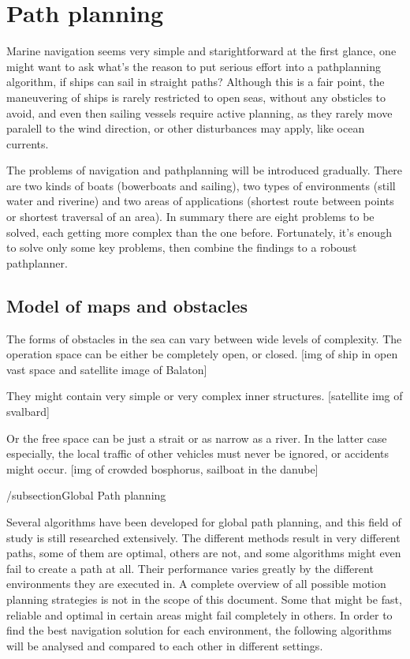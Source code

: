 \section{Path planning} 

Marine navigation seems very simple and starightforward at the first glance, one might want to ask what's the reason to put serious effort into a pathplanning algorithm, if ships can sail in straight paths? Although this is a fair point, the maneuvering of ships is rarely restricted to open seas, without any obsticles to avoid, and even then sailing vessels require active planning, as they rarely move paralell to the wind direction, or other disturbances may apply, like ocean currents.

The problems of navigation and pathplanning will be introduced gradually. There are two kinds of boats (bowerboats and sailing), two types of environments (still water and riverine) and two areas of applications (shortest route between points or shortest traversal of an area). In summary there are eight problems to be solved, each getting more complex than the one before. Fortunately, it's enough to solve only some key problems, then combine the findings to a roboust pathplanner.

\subsection{Model of maps and obstacles}

The forms of obstacles in the sea can vary between wide levels of complexity. The operation space can be either be completely open, or closed.
[img of ship in open vast space and satellite image of Balaton]

They might contain very simple or very complex inner structures.
[satellite img of svalbard]

Or the free space can be just a strait or as narrow as a river. In the latter case especially, the local traffic of other vehicles must never be ignored, or accidents might occur.
[img of crowded bosphorus, sailboat in the danube]

/subsection{Global Path planning}

Several algorithms have been developed for global path planning, and this field of study is still researched extensively. The different methods result in very different paths, some of them are optimal, others are not, and some algorithms might even fail to create a path at all. Their performance varies greatly by the different environments they are executed in. A complete overview of all possible motion planning strategies is not in the scope of this document. Some that might be fast, reliable and optimal in certain areas might fail completely in others. In order to find the best navigation solution for each environment, the following algorithms will be analysed and compared to each other in different settings.

